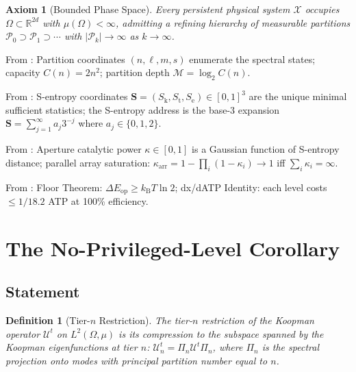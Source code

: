 \documentclass[11pt,twocolumn,a4paper]{article}
\newtheorem{definition}[theorem]{Definition}
\newtheorem{axiom}{Axiom}
\theoremstyle{remark}
\newcommand{\kB}{k_{\mathrm{B}}}
\newcommand{\Sk}{S_{\mathrm{k}}}
\newcommand{\St}{S_{\mathrm{t}}}
\newcommand{\Se}{S_{\mathrm{e}}}
\newcommand{\Sent}{\bm{S}}
\newcommand{\kap}{\kappa}
\begin{document}
\begin{axiom}[Bounded Phase Space]
\label{ax:bps}
Every persistent physical system $\mathcal{X}$ occupies $\Omega \subset
\mathbb{R}^{2d}$ with $\mu(\Omega) < \infty$, admitting a refining hierarchy of
measurable partitions $\mathscr{P}_0 \supset \mathscr{P}_1 \supset \cdots$
with $|\mathscr{P}_k| \to \infty$ as $k \to \infty$.
\end{axiom}

\noindent From \citep{companion1}: Partition coordinates $(n, \ell, m, s)$
enumerate the spectral states; capacity $C(n) = 2n^2$; partition depth
$\mathcal{M} = \log_2 C(n)$.

\noindent From \citep{companion2}: S-entropy coordinates $\Sent = (\Sk, \St, \Se)
\in [0,1]^3$ are the unique minimal sufficient statistics; the S-entropy address
is the base-3 expansion $\Sent = \sum_{j=1}^\infty a_j 3^{-j}$ where
$a_j \in \{0, 1, 2\}$.

\noindent From \citep{companion3}: Aperture catalytic power $\kap \in [0,1]$
is a Gaussian function of S-entropy distance; parallel array saturation:
$\kap_{\mathrm{arr}} = 1 - \prod_i(1-\kap_i) \to 1$ iff $\sum_i \kap_i = \infty$.

\noindent From \citep{companion4}: Floor Theorem: $\Delta E_{\mathrm{op}} \geq
\kB T \ln 2$; dx/dATP Identity: each level costs $\leq 1/18.2$ ATP at 100\%
efficiency.

\section{The No-Privileged-Level Corollary}
\label{sec:npl}

\subsection{Statement}

\begin{definition}[Tier-$n$ Restriction]
\label{def:tier_restrict}
The \emph{tier-$n$ restriction} of the Koopman operator $\mathcal{U}^t$ on
$L^2(\Omega, \mu)$ is its compression to the subspace spanned by the Koopman
eigenfunctions at tier $n$:
$\mathcal{U}^t_n = \Pi_n \mathcal{U}^t \Pi_n$,
where $\Pi_n$ is the spectral projection onto modes with principal partition
number equal to $n$.
\end{definition}
\end{document}
